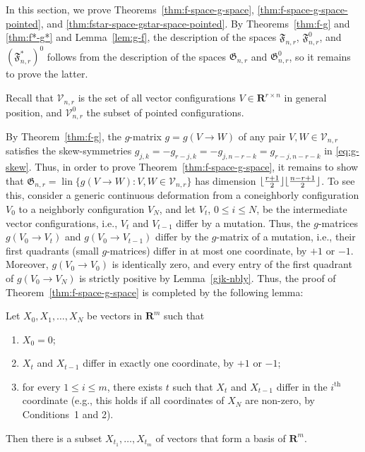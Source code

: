 \documentclass[a4paper,USenglish,cleveref, autoref, thm-restate,nolineno]{socg-lipics-v2021}
\DeclareMathOperator{\lin}{lin}
\newcommand{\fspace}{\mathfrak{F}}
\newcommand{\gspace}{\mathfrak{G}}
\renewcommand{\leq}{\leqslant}
\newcommand{\R}{\mathbf{R}}
\DeclarePairedDelimiter\floor{\lfloor}{\rfloor}
\begin{document}
In this section, we prove Theorems~\ref{thm:f-space-g-space}, \ref{thm:f-space-g-space-pointed}, and \ref{thm:fstar-space-gstar-space-pointed}. By Theorems~\ref{thm:f-g} and \ref{thm:f*-g*} and Lemma~\ref{lem:g-f}, the description of the spaces $\fspace_{n,r}$, $\fspace^0_{n,r}$, and $(\fspace^*_{n,r})^0$ follows from the description of the spaces $\gspace_{n,r}$ and $\gspace_{n,r}^0$, so it remains to prove the latter. 

Recall that $\mathcal{V}_{n,r}$ is the set of all vector configurations $V\in \R^{r\times n}$ in general position, and $\mathcal{V}_{n,r}^0$ the subset of pointed configurations.

By Theorem~\ref{thm:f-g}, the $g$-matrix $g=g(V\to W)$ of any pair $V,W\in \mathcal{V}_{n,r}$ satisfies the skew-symmetries $g_{j,k}=-g_{r-j,k}=-g_{j,n-r-k}=g_{r-j,n-r-k}$ in \eqref{eq:g-skew}. Thus, in order to prove Theorem~\ref{thm:f-space-g-space}, it remains to show that $\gspace_{n,r}=\lin\{g(V\to W)\colon V,W\in \mathcal{V}_{n,r}\}$ has dimension $\floor{\frac{r+1}{2}} \floor{\frac{n-r+1}{2}}$. To see this, consider a generic continuous deformation from a coneighborly configuration $V_0$ to a neighborly configuration $V_N$, and let $V_t$, $0\leq i \leq N$,  be the intermediate vector configurations, i.e., $V_t$ and $V_{t-1}$ differ by a mutation. Thus, the $g$-matrices $g(V_0\to V_t)$ and $g(V_0\to V_{t-1})$ differ by the $g$-matrix of a mutation, i.e., their first quadrants (small $g$-matrices) differ in at most one coordinate, by $+1$ or $-1$. Moreover, $g(V_0\to V_0)$ is identically zero, and every entry of the first quadrant of $g(V_0\to V_N)$ is strictly positive by Lemma~\ref{gjk-nbly}. Thus, the proof of Theorem~\ref{thm:f-space-g-space} is completed by the following lemma:

\begin{lemma} 
\label{lem:basis1}
Let $X_0,X_1,\dots,X_N$ be vectors in $\R^m$ such that
\label{lem:basis}
\begin{enumerate}
\item $X_0=0$;
\item $X_t$ and $X_{t-1}$ differ in exactly one coordinate, by $+1$ or $-1$;
\item for every $1 \leq i \leq m$, there exists $t$ such that $X_t$ and $X_{t-1}$ differ in the $i^{\text{th}}$ coordinate
(e.g., this holds if all coordinates of $X_N$ are non-zero, by Conditions~1 and 2).
\end{enumerate}
Then there is a subset $X_{t_1}, \dots, X_{t_m}$ of vectors that form a basis of $\R^m$.
\end{lemma}
\end{document}
